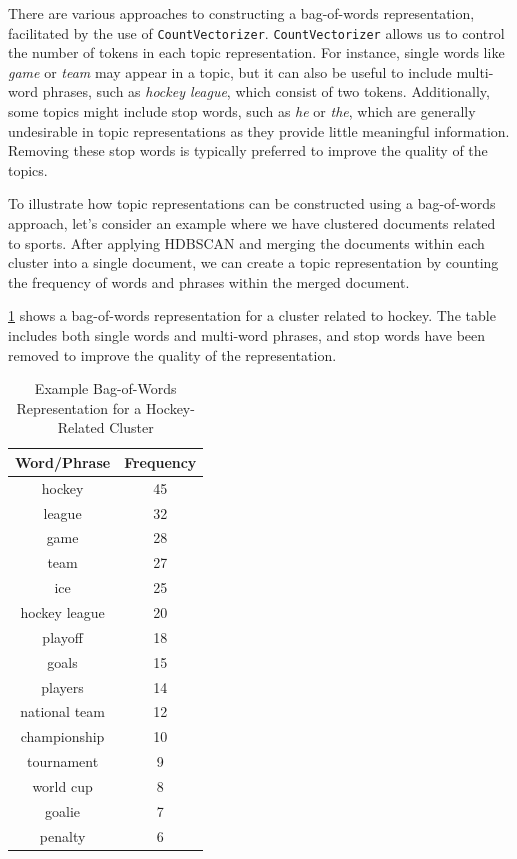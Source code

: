 There are various approaches to constructing a bag-of-words representation, facilitated by the use of \texttt{CountVectorizer}. \texttt{CountVectorizer} allows us to control the number of tokens in each topic representation. For instance, single words like \textit{game} or \textit{team} may appear in a topic, but it can also be useful to include multi-word phrases, such as \textit{hockey league}, which consist of two tokens. Additionally, some topics might include stop words, such as \textit{he} or \textit{the}, which are generally undesirable in topic representations as they provide little meaningful information. Removing these stop words is typically preferred to improve the quality of the topics.

To illustrate how topic representations can be constructed using a bag-of-words approach, let's consider an example where we have clustered documents related to sports. After applying HDBSCAN and merging the documents within each cluster into a single document, we can create a topic representation by counting the frequency of words and phrases within the merged document.

\cref{tab:hockey_cluster} shows a bag-of-words representation for a cluster related to hockey. The table includes both single words and multi-word phrases, and stop words have been removed to improve the quality of the representation.


\begin{table}[h]
    \centering
    \begin{tabular}{|c|c|}
        \hline
        \textbf{Word/Phrase} & \textbf{Frequency} \\
        \hline
        hockey               & 45                 \\
        league               & 32                 \\
        game                 & 28                 \\
        team                 & 27                 \\
        ice                  & 25                 \\
        hockey league        & 20                 \\
        playoff              & 18                 \\
        goals                & 15                 \\
        players              & 14                 \\
        national team        & 12                 \\
        championship         & 10                 \\
        tournament           & 9                  \\
        world cup            & 8                  \\
        goalie               & 7                  \\
        penalty              & 6                  \\
        \hline
    \end{tabular}
    \caption{Example Bag-of-Words Representation for a Hockey-Related Cluster}
    \label{tab:hockey_cluster}
\end{table}


